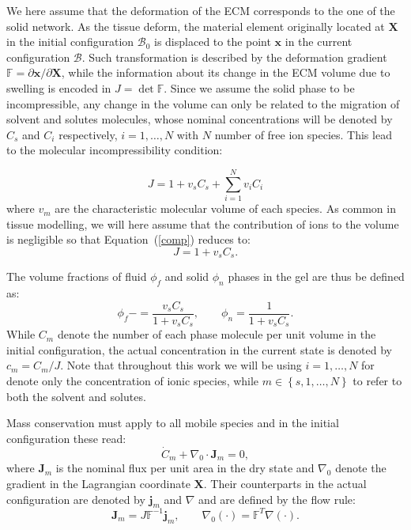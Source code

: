 \documentclass[runningheads]{llncs}
\newcommand{\F}{\ensuremath{\mathbb{F}}}
\begin{document}
We here assume that the deformation of the ECM corresponds to the one of the solid network. As the tissue deform, the material element originally located at $\mathbf{X}$ in the initial configuration $\mathcal{B}_0$ is displaced to the point $\mathbf{x}$ in the current configuration $\mathcal{B}$. Such transformation is described by the deformation gradient $\F= \partial \mathbf{x}/\partial \mathbf{X}$, while the information about its change in the ECM volume due to swelling is encoded in $J= \det \F$. Since we assume the solid phase to be incompressible, any change in the volume can only be related to the migration of solvent and solutes molecules, whose nominal concentrations will be denoted by $C_s$ and $C_i$ respectively, $i=1,\ldots,N$ with $N$ number of free ion species. This lead to the molecular incompressibility condition:

\begin{equation}
 J= 1 + v_s C_s +\sum\limits_{i=1}^{N} v_i C_i
 \label{comp}
\end{equation}
where $v_m$ are the characteristic molecular volume of each species. As common in tissue modelling, we will here assume that the contribution of ions to the volume is negligible so that Equation~(\ref{comp}) reduces to:
\begin{equation}
J=1+v_s C_s.
\end{equation} 

The volume fractions of fluid $\phi_f$ and solid $\phi_n$ phases in the gel are thus be defined as:
\begin{equation}
\phi_f -= \frac{v_sC_s}{1+v_sC_s}, \qquad \phi_n = \frac{1}{1+v_sC_s}.
\end{equation}
While $C_m$ denote the number of each phase molecule per unit volume in the initial configuration, the actual concentration in the current state is denoted by $c_m=C_m/J$. Note that throughout this work we will be using $i=1,\ldots,N$ for denote only the concentration of ionic species, while $m\in\left\{s,1,\ldots,N\right\}$ to refer to both the solvent and solutes.

Mass conservation must apply to all mobile species and in the initial configuration these read:
\begin{equation}
\dot{C}_m + \nabla_0 \cdot \mathbf{J}_m = 0, 
\end{equation}
where $\mathbf{J}_m$ is the nominal flux per unit area in the dry state and $\nabla_0$ denote the gradient in the Lagrangian coordinate $\mathbf{X}$. Their counterparts in the actual configuration are denoted by $\mathbf{j}_m$ and $\nabla$ and are defined by the flow rule:
\begin{equation}
\mathbf{J}_m = J \F^{-1} \mathbf{j}_m, \qquad \nabla_0 (\cdot) = \F^{T} \nabla(\cdot).
\end{equation}
\end{document}

